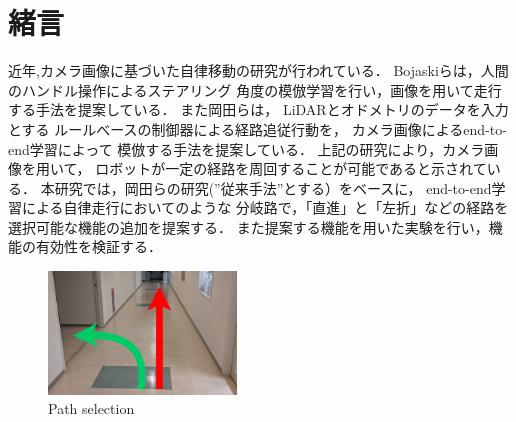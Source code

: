 \documentclass[10pt]{jarticle}
\begin{document}
    \section{緒\hspace{2zw}言}%
    近年,カメラ画像に基づいた自律移動の研究が行われている．%
    Bojaskiら\cite{nvidia}は，人間のハンドル操作によるステアリング
    角度の模倣学習を行い，画像を用いて走行する手法を提案している．
    また岡田ら\cite{okada}は，
    LiDARとオドメトリのデータを入力とする
    ルールべースの制御器による経路追従行動を，
    カメラ画像によるend-to-end学習によって
    模倣する手法を提案している．
    上記の研究により，カメラ画像を用いて，
    ロボットが一定の経路を周回することが可能であると示されている．
    本研究では，岡田らの研究\cite{okada}(”従来手法”とする）をベースに，
    end-to-end学習による自律走行においてのような
    分岐路で，「直進」と「左折」などの経路を選択可能な機能の追加を提案する．
    また提案する機能を用いた実験を行い，機能の有効性を検証する．

    \begin{center}
        \begin{figure}[htb]
            \centering
            \includegraphics[width=5cm]{./fig/zyuzibunki.png}
            \caption{Path selection}
            \label{fig:bunki}
        \end{figure}
    \end{center}
\end{document}
